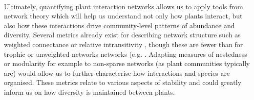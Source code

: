 \documentclass[a4,12pt]{article}
\begin{document}
        \paragraph{}
        Ultimately, quantifying plant interaction networks allows us to apply tools from network theory which will help us understand not only how plants interact, but also how these interactions drive community-level patterns of abundance and diversity. Several metrics already exist for describing network structure such as weighted connectance \parencite{Ulanowicz1991} or relative intransitivity \parencite{Laird2006a}, though these are fewer than for trophic or unweighted networks networks (e.g. \textcite{Bersier2002, Delmas2019}. Adapting measures of nestedness or modularity for example to non-sparse networks (as plant communities typically are) would allow us to further characterise how interactions and species are organised. These metrics relate to various aspects of stability and could greatly inform us on how diversity is maintained between plants. 







% 
% 

\newpage
\end{document}
